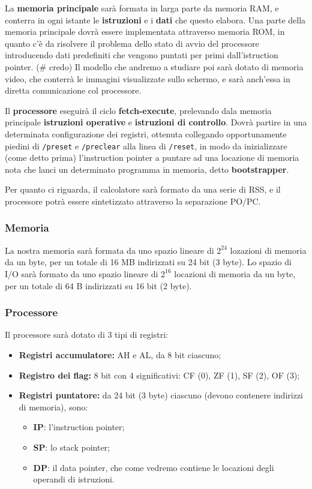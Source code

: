 \documentclass[a4paper,11pt]{article}
\begin{document}
La \textbf{memoria principale} sarà formata in larga parte da memoria RAM, e conterra in ogni istante le \textbf{istruzioni} e i \textbf{dati} che questo elabora.
Una parte della memoria principale dovrà essere implementata attraverso memoria ROM, in quanto c'è da risolvere il problema dello stato di avvio del processore introducendo dati predefiniti che vengono puntati per primi dall'istruction pointer. (# credo)
Il modello che andremo a studiare poi sarà dotato di memoria video, che conterrà le immagini visualizzate sullo schermo, e sarà anch'essa in diretta comunicazione col processore.

Il \textbf{processore} eseguirà il ciclo \textbf{fetch-execute}, prelevando dala memoria principale \textbf{istruzioni operative} e \textbf{istruzioni di controllo}.
Dovrà partire in una determinata configurazione dei registri, ottenuta collegando opportunamente piedini di \lstinline|/preset| e \lstinline|/preclear| alla linea di \lstinline|/reset|, in modo da inizializzare (come detto prima) l'instruction pointer a puntare ad una locazione di memoria nota che lanci un determinato programma in memoria, detto \textbf{bootstrapper}.

Per quanto ci riguarda, il calcolatore sarà formato da una serie di RSS, e il processore potrà essere sintetizzato attraverso la separazione PO/PC.

\subsubsection{Memoria}
La nostra memoria sarà formata da uno spazio lineare di $2^{24}$ lozazioni di memoria da un byte, per un totale di 16 MB indirizzati su 24 bit (3 byte).
Lo spazio di I/O sarà formato da uno spazio lineare di $2^{16}$ locazioni di memoria da un byte, per un totale di 64 B indirizzati su 16 bit (2 byte).

\subsubsection{Processore}
Il processore sarà dotato di 3 tipi di registri:
\begin{itemize}
	\item \textbf{Registri accumulatore:} AH e AL, da 8 bit ciascuno;
	\item \textbf{Registro dei flag:} 8 bit con 4 significativi: CF (0), ZF (1), SF (2), OF (3);
	\item \textbf{Registri puntatore:} da 24 bit (3 byte) ciascuno (devono contenere indirizzi di memoria), sono:
		\begin{itemize}
			\item \textbf{IP}: l'instruction pointer;
			\item \textbf{SP}: lo stack pointer;
			\item \textbf{DP}: il data pointer, che come vedremo contiene le locazioni degli operandi di istruzioni.
		\end{itemize}
\end{itemize}
\end{document}

